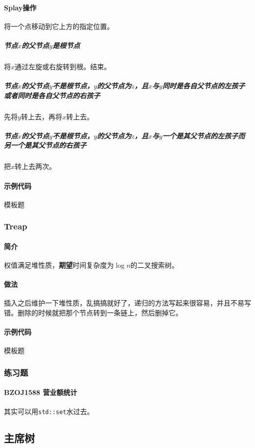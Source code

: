 \documentclass[]{cpp}
\begin{document}
\paragraph{Splay操作} 将一个点移动到它上方的指定位置。
\subparagraph{节点$x$的父节点$y$是根节点} 将$x$通过左旋或右旋转到根。结束。
\subparagraph{节点$x$的父节点$y$不是根节点，$y$的父节点为$z$，且$x$与$y$同时是各自父节点的左孩子或者同时是各自父节点的右孩子} 先将$y$转上去，再将$x$转上去。
\subparagraph{节点$x$的父节点$y$不是根节点，$y$的父节点为$z$，且$x$与$y$一个是其父节点的左孩子而另一个是其父节点的右孩子} 把$x$转上去两次。
\paragraph{示例代码} 模板题
\subsubsection{Treap}
\paragraph{简介} 权值满足堆性质，\textbf{期望}时间复杂度为$\log{n}$的二叉搜索树。
\paragraph{做法} 插入之后维护一下堆性质，乱搞搞就好了，递归的方法写起来很容易，并且不易写错。删除的时候就把那个节点转到一条链上，然后删掉它。
\paragraph{示例代码} 模板题
\subsubsection{练习题}
\paragraph{BZOJ1588 营业额统计} 其实可以用\verb|std::set|水过去。
\subsection{主席树}
\end{document}
